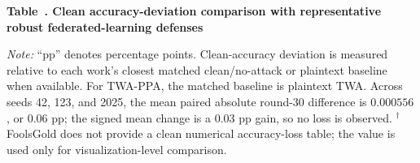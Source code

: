 \documentclass{article}
\begin{document}
    
\begin{center}
\label{tab:accuracy_loss_comparison}
\textbf{Table~\thetable. Clean accuracy-deviation comparison with representative robust federated-learning defenses}

\vspace{0.5em}
\vspace{0.5em}
\begin{flushleft}
\footnotesize
\textit{Note:} ``pp'' denotes percentage points. Clean-accuracy deviation is measured relative to each work's closest matched clean/no-attack or plaintext baseline when available. For TWA-PPA, the matched baseline is plaintext TWA. Across seeds 42, 123, and 2025, the mean paired absolute round-30 difference is $0.000556$, or $0.06$ pp; the signed mean change is a $0.03$ pp gain, so no loss is observed.
$^{\dagger}$ FoolsGold does not provide a clean numerical accuracy-loss table; the value is used only for visualization-level comparison.
\end{flushleft}
\end{center}
\end{document}
